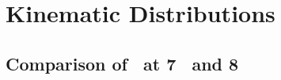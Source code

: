 %
%
%
%
\section{Kinematic Distributions}

\subsection{Comparison of \ZZllll\ at 7 \tev\ and 8 \tev}

